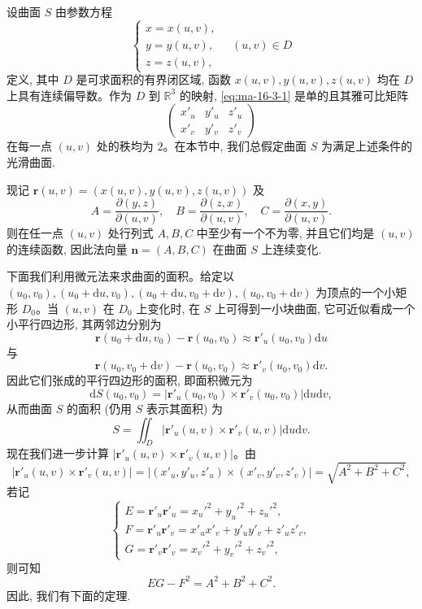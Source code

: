 设曲面 $S$ 由参数方程
\begin{equation}
  \begin{cases}
    x=x(u,v),\\
    y=y(u,v),\\
    z=z(u,v),
  \end{cases}
  \quad (u,v)\in D
  \label{eq:ma-16-3-1}
\end{equation}
定义, 其中 $D$ 是可求面积的有界闭区域, 函数 $x(u,v),y(u,v),z(u,v)$ 均在 $D$ 上具有连续偏导数。作为 $D$ 到 $\mathbb R^3$ 的映射, \eqref{eq:ma-16-3-1} 是单的且其雅可比矩阵
\[
  \begin{pmatrix}
    x'_u & y'_u & z'_u\\
    x'_v & y'_v & z'_v
  \end{pmatrix}
\]
在每一点 $(u,v)$ 处的秩均为 $2$。在本节中, 我们总假定曲面 $S$ 为满足上述条件的光滑曲面.

现记 $\boldsymbol r(u,v)=(x(u,v),y(u,v),z(u,v))$ 及
\begin{equation}
  A=\frac{\partial(y,z)}{\partial(u,v)},\quad
  B=\frac{\partial(z,x)}{\partial(u,v)},\quad
  C=\frac{\partial(x,y)}{\partial(u,v)}.
  \label{eq:ma-16-3-2}
\end{equation}
则在任一点 $(u,v)$ 处行列式 $A,B,C$ 中至少有一个不为零, 并且它们均是 $(u,v)$ 的连续函数, 因此法向量 $\boldsymbol n=(A,B,C)$ 在曲面 $S$ 上连续变化.

下面我们利用微元法来求曲面的面积。给定以 $(u_0,v_0),(u_0+\mathrm du,v_0),(u_0+\mathrm du,v_0+\mathrm dv),(u_0,v_0+\mathrm dv)$ 为顶点的一个小矩形 $D_0$。当 $(u,v)$ 在 $D_0$ 上变化时, 在 $S$ 上可得到一小块曲面, 它可近似看成一个小平行四边形, 其两邻边分别为
\[
  \boldsymbol r(u_0+\mathrm du,v_0)-\boldsymbol r(u_0,v_0)
  \approx \boldsymbol r'_u(u_0,v_0)\mathrm du
\]
与
\[
  \boldsymbol r(u_0,v_0+\mathrm dv)-\boldsymbol r(u_0,v_0)
  \approx \boldsymbol r'_v(u_0,v_0)\mathrm dv.
\]
因此它们张成的平行四边形的面积, 即面积微元为
\[
  \mathrm dS(u_0,v_0)=|\boldsymbol r'_u(u_0,v_0)\times\boldsymbol r'_v(u_0,v_0)|\mathrm du\mathrm dv,
\]
从而曲面 $S$ 的面积 (仍用 $S$ 表示其面积) 为
\[
  S=\iint_D |\boldsymbol r'_u(u,v)\times\boldsymbol r'_v(u,v)|\mathrm du\mathrm dv.
\]
现在我们进一步计算 $|\boldsymbol r'_u(u,v)\times\boldsymbol r'_v(u,v)|$。由
\[
  |\boldsymbol r'_u(u,v)\times\boldsymbol r'_v(u,v)|
  =|(x'_u,y'_u,z'_u)\times(x'_v,y'_v,z'_v)|
  =\sqrt{A^2+B^2+C^2},
\]
若记
\begin{equation}
  \begin{cases}
    E=\boldsymbol r'_u\boldsymbol r'_u=x_u'^2+y_u'^2+z_u'^2,\\
    F=\boldsymbol r'_u\boldsymbol r'_v=x'_ux'_v+y'_uy'_v+z'_uz'_v,\\
    G=\boldsymbol r'_v\boldsymbol r'_v=x_v'^2+y_v'^2+z_v'^2,
  \end{cases}
  \label{eq:ma-16-3-3}
\end{equation}
则可知
\[
  EG-F^2=A^2+B^2+C^2.
\]
因此, 我们有下面的定理.

